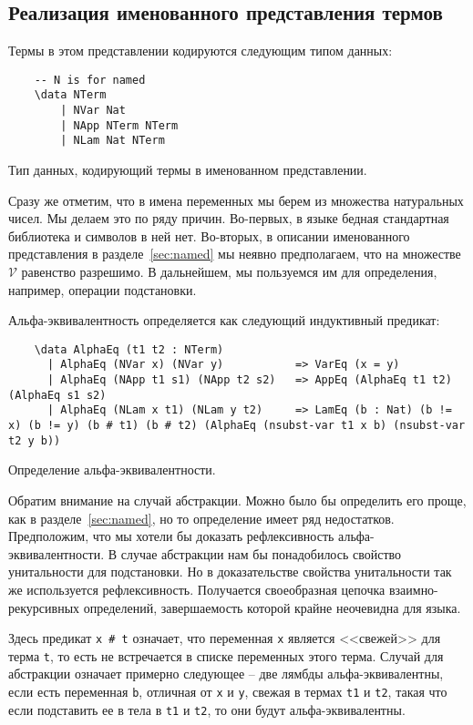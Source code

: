 \subsection{Реализация именованного представления термов}

Термы в этом представлении кодируются следующим типом данных:
\begin{listing}[H]
  \begin{verbatim}
    -- N is for named
    \data NTerm
        | NVar Nat
        | NApp NTerm NTerm
        | NLam Nat NTerm
  \end{verbatim}
  \caption{Тип данных, кодирующий термы в именованном представлении.}
\end{listing}

Сразу же отметим, что в имена переменных мы берем из множества натуральных чисел. Мы делаем это по ряду причин. Во-первых, в языке бедная стандартная библиотека и символов в ней нет. Во-вторых, в описании именованного представления в разделе~\ref{sec:named} мы неявно предполагаем, что на множестве $\mathcal{V}$ равенство разрешимо. В дальнейшем, мы пользуемся им для определения, например, операции подстановки.

Альфа-эквивалентность определяется как следующий индуктивный предикат:
\begin{listing}[H]
  \begin{verbatim}
    \data AlphaEq (t1 t2 : NTerm)
      | AlphaEq (NVar x) (NVar y)           => VarEq (x = y)
      | AlphaEq (NApp t1 s1) (NApp t2 s2)   => AppEq (AlphaEq t1 t2) (AlphaEq s1 s2)
      | AlphaEq (NLam x t1) (NLam y t2)     => LamEq (b : Nat) (b != x) (b != y) (b # t1) (b # t2) (AlphaEq (nsubst-var t1 x b) (nsubst-var t2 y b))
  \end{verbatim}
  \caption{Определение альфа-эквивалентности.}
\end{listing}

Обратим внимание на случай абстракции. Можно было бы определить его проще, как в разделе~\ref{sec:named}, но то определение имеет ряд недостатков. Предположим, что мы хотели бы доказать рефлексивность альфа-эквивалентности. В случае абстракции нам бы понадобилось свойство унитальности для подстановки. Но в доказательстве свойства унитальности так же используется рефлексивность. Получается своеобразная цепочка взаимно-рекурсивных определений, завершаемость которой крайне неочевидна для языка.

Здесь предикат \texttt{x # t} означает, что переменная \texttt{x} является <<свежей>> для терма \texttt{t}, то есть не встречается в списке переменных этого терма. Случай для абстракции означает примерно следующее -- две лямбды альфа-эквивалентны, если есть переменная \texttt{b}, отличная от \texttt{x} и \texttt{y}, свежая в термах \texttt{t1} и \texttt{t2}, такая что если подставить ее в тела в \texttt{t1} и \texttt{t2}, то они будут альфа-эквивалентны.

